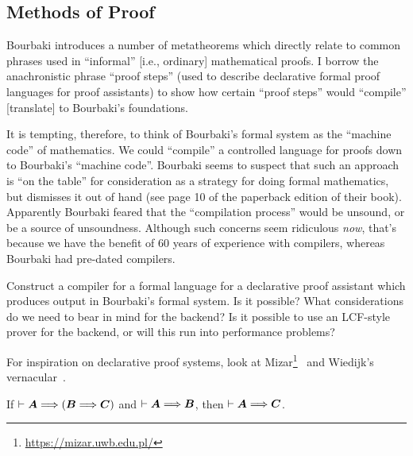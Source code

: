 \subsection{Methods of Proof} Bourbaki introduces a number of
metatheorems which directly relate to common phrases used in
``informal'' [i.e., ordinary] mathematical proofs. I borrow the
anachronistic phrase ``proof steps'' (used to describe declarative
formal proof languages for proof assistants) to show how certain ``proof
steps'' would ``compile'' [translate] to Bourbaki's foundations.

It is tempting, therefore, to think of Bourbaki's formal system as
the ``machine code'' of mathematics. We could ``compile'' a controlled
language for proofs down to Bourbaki's ``machine code''. Bourbaki seems
to suspect that such an approach is ``on the table'' for consideration
as a strategy for doing formal mathematics, but dismisses it out of hand
(see page 10 of the paperback edition of their book). Apparently
Bourbaki feared that the ``compilation process'' would be unsound, or be
a source of unsoundness. Although such concerns seem ridiculous \emph{now},
that's because we have the benefit of 60 years of experience with
compilers, whereas Bourbaki had pre-dated compilers.

\begin{puzzle}
Construct a compiler for a formal language for a declarative proof
assistant which produces output in Bourbaki's formal system. Is it possible?
What considerations do we need to bear in mind for the backend? Is it
possible to use an LCF-style prover for the backend, or will this run
into performance problems?

For inspiration on declarative proof systems, look at Mizar\footnote{\url{https://mizar.uwb.edu.pl/}}~\cite{mizar}
and Wiedijk's vernacular~\cite{wiedijk2000vernacular}.
\end{puzzle}


\begin{lemma}\label{lemma:hypothetical-syllogism}%
If $\vdash\boldsymbol{A}\Longrightarrow(\boldsymbol{B}\Longrightarrow\boldsymbol{C})$
and $\vdash\boldsymbol{A}\Longrightarrow\boldsymbol{B}$,
then $\vdash\boldsymbol{A}\Longrightarrow\boldsymbol{C}$.
\end{lemma}

